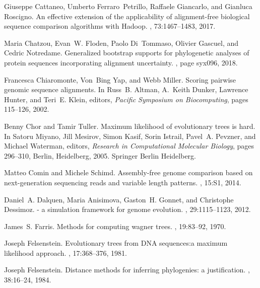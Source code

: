 \documentclass[review]{elsarticle}
\begin{document}
{\begin{thebibliography}{10}
Giuseppe Cattaneo, Umberto Ferraro~Petrillo, Raffaele Giancarlo, and Gianluca
  Roscigno.
\newblock An effective extension of the applicability of alignment-free
  biological sequence comparison algorithms with {H}adoop.
, 73:1467--1483, 2017.

Maria Chatzou, Evan~W. Floden, Paolo Di~Tommaso, Olivier Gascuel, and Cedric
  Notredame.
\newblock Generalized bootstrap supports for phylogenetic analyses of protein
  sequences incorporating alignment uncertainty.
, page syx096, 2018.

Francesca Chiaromonte, Von~Bing Yap, and Webb Miller.
\newblock Scoring pairwise genomic sequence alignments.
\newblock In Russ~B. Altman, A.~Keith Dunker, Lawrence Hunter, and Teri~E.
  Klein, editors, {\em Pacific Symposium on Biocomputing}, pages 115--126,
  2002.

Benny Chor and Tamir Tuller.
\newblock Maximum likelihood of evolutionary trees is hard.
\newblock In Satoru Miyano, Jill Mesirov, Simon Kasif, Sorin Istrail, Pavel~A.
  Pevzner, and Michael Waterman, editors, {\em Research in Computational
  Molecular Biology}, pages 296--310, Berlin, Heidelberg, 2005. Springer Berlin
  Heidelberg.

Matteo Comin and Michele Schimd.
\newblock Assembly-free genome comparison based on next-generation sequencing
  reads and variable length patterns.
, 15:S1, 2014.

Daniel~A. Dalquen, Maria Anisimova, Gaston~H. Gonnet, and Christophe Dessimoz.
 - a simulation framework for genome evolution.
, 29:1115--1123, 2012.

James~S. Farris.
\newblock Methods for computing wagner trees.
, 19:83--92, 1970.

Joseph Felsenstein.
\newblock Evolutionary trees from {DNA} sequences:a maximum likelihood
  approach.
, 17:368--376, 1981.

Joseph Felsenstein.
\newblock Distance methods for inferring phylogenies: a justification.
,
  38:16--24, 1984.


\end{thebibliography}}
\end{document}
